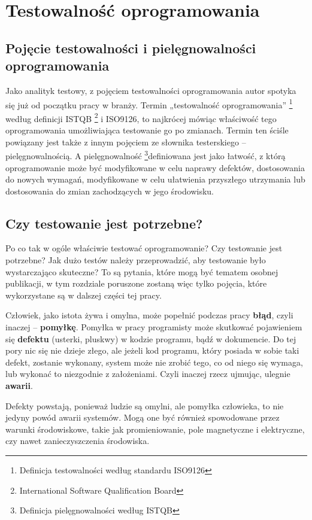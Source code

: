 \chapter{Testowalność oprogramowania}
\label{testowalnosc}
\section{Pojęcie testowalności i pielęgnowalności oprogramowania}
Jako analityk testowy, z pojęciem testowalności oprogramowania autor spotyka się już od początku pracy w branży. Termin „testowalność oprogramowania” \footnote{Definicja testowalności według standardu ISO9126}  według definicji ISTQB \footnote{International Software Qualification Board}  i ISO9126, to najkrócej mówiąc właściwość tego oprogramowania umożliwiająca testowanie go po zmianach. Termin ten ściśle powiązany jest także z innym pojęciem ze słownika testerskiego – pielęgnowalnością. A pielęgnowalność \footnote{Definicja pielęgnowalności według ISTQB}definiowana jest jako łatwość, z którą oprogramowanie może być modyfikowane w celu naprawy defektów, dostosowania do nowych wymagań, modyfikowane w celu ułatwienia przyszłego utrzymania lub dostosowania do zmian zachodzących w jego środowisku.

\section{Czy testowanie jest potrzebne?}
Po co tak w ogóle właściwie testować oprogramowanie? Czy testowanie jest potrzebne? Jak dużo testów należy przeprowadzić, aby testowanie było wystarczająco skuteczne? To są pytania, które mogą być tematem osobnej publikacji, w tym rozdziale poruszone zostaną więc tylko pojęcia, które wykorzystane są w dalszej części tej pracy.

Człowiek, jako istota żywa i omylna, może popełnić podczas pracy \textbf{błąd}, czyli inaczej – \textbf{pomyłkę}. Pomyłka w pracy programisty może skutkować pojawieniem się \textbf{defektu} (usterki, pluskwy) w kodzie programu, bądź w dokumencie. Do tej pory nic się nie dzieje złego, ale jeżeli kod programu, który posiada w sobie taki defekt, zostanie wykonany, system może nie zrobić tego, co od niego się wymaga, lub wykonać to niezgodnie z założeniami. Czyli inaczej rzecz ujmując, ulegnie \textbf{awarii}. 

Defekty powstają, ponieważ ludzie są omylni, ale pomyłka człowieka, to nie jedyny powód awarii systemów. Mogą one być również spowodowane przez warunki środowiskowe, takie jak promieniowanie, pole magnetyczne i elektryczne, czy nawet zanieczyszczenia środowiska.

